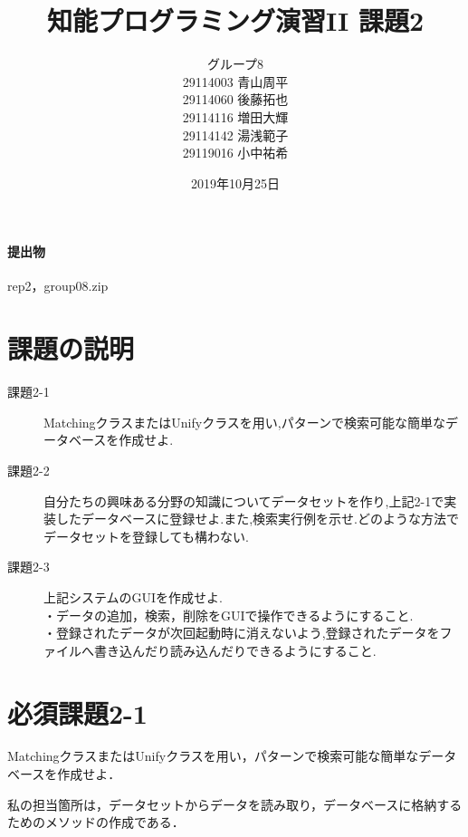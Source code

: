\documentclass[12pt]{jarticle}
\title{知能プログラミング演習II 課題2}
\author{グループ8\\
	29114003 青山周平\\
	29114060 後藤拓也\\
	29114116 増田大輝\\
	29114142 湯浅範子\\
	29119016 小中祐希\\
}
\date{2019年10月25日}
\begin{document}
\maketitle

\paragraph{提出物} rep2，group08.zip

\section{課題の説明}
\begin{description}
\item[課題2-1] MatchingクラスまたはUnifyクラスを用い,パターンで検索可能な簡単なデータベースを作成せよ.
\item[課題2-2] 自分たちの興味ある分野の知識についてデータセットを作り,上記2-1で実装したデータベースに登録せよ.また,検索実行例を示せ.どのような方法でデータセットを登録しても構わない.
\item[課題2-3] 上記システムのGUIを作成せよ. \\
・データの追加，検索，削除をGUIで操作できるようにすること. \\
・登録されたデータが次回起動時に消えないよう,登録されたデータをファイルへ書き込んだり読み込んだりできるようにすること.
\end{description}

\section{必須課題2-1}
\begin{screen}
  MatchingクラスまたはUnifyクラスを用い，パターンで検索可能な簡単なデータベースを作成せよ．
\end{screen}
私の担当箇所は，データセットからデータを読み取り，データベースに格納するためのメソッドの作成である．
\end{document}
